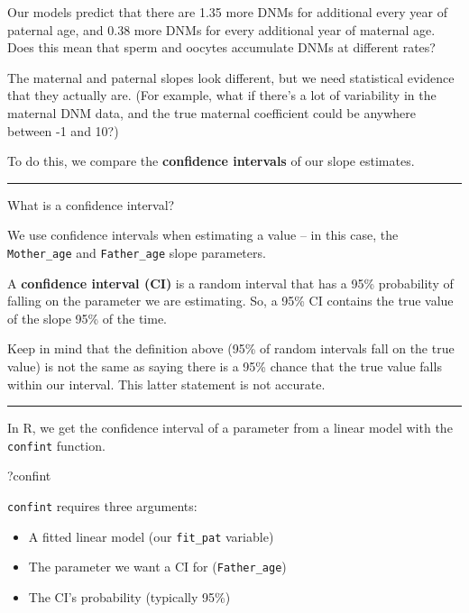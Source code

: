 \documentclass[
]{article}
\newenvironment{Shaded}{\begin{snugshade}}{\end{snugshade}}
\newcommand{\NormalTok}[1]{#1}
\providecommand{\tightlist}{%
  \setlength{\itemsep}{0pt}\setlength{\parskip}{0pt}}
\begin{document}
Our models predict that there are 1.35 more DNMs for additional every
year of paternal age, and 0.38 more DNMs for every additional year of
maternal age. Does this mean that sperm and oocytes accumulate DNMs at
different rates?

The maternal and paternal slopes look different, but we need statistical
evidence that they actually are. (For example, what if there's a lot of
variability in the maternal DNM data, and the true maternal coefficient
could be anywhere between -1 and 10?)

To do this, we compare the \textbf{confidence intervals} of our slope
estimates.

\begin{center}\rule{0.5\linewidth}{0.5pt}\end{center}

What is a confidence interval?

We use confidence intervals when estimating a value -- in this case, the
\texttt{Mother\_age} and \texttt{Father\_age} slope parameters.

A \textbf{confidence interval (CI)} is a random interval that has a 95\%
probability of falling on the parameter we are estimating. So, a 95\% CI
contains the true value of the slope 95\% of the time.

Keep in mind that the definition above (95\% of random intervals fall on
the true value) is not the same as saying there is a 95\% chance that
the true value falls within our interval. This latter statement is not
accurate.

\begin{center}\rule{0.5\linewidth}{0.5pt}\end{center}

In R, we get the confidence interval of a parameter from a linear model
with the \texttt{confint} function.

\begin{Shaded}
\begin{Highlighting}[]
\NormalTok{?confint}
\end{Highlighting}
\end{Shaded}

\texttt{confint} requires three arguments:

\begin{itemize}
\tightlist
\item
  A fitted linear model (our \texttt{fit\_pat} variable)
\item
  The parameter we want a CI for (\texttt{Father\_age})
\item
  The CI's probability (typically 95\%)
\end{itemize}
\end{document}
